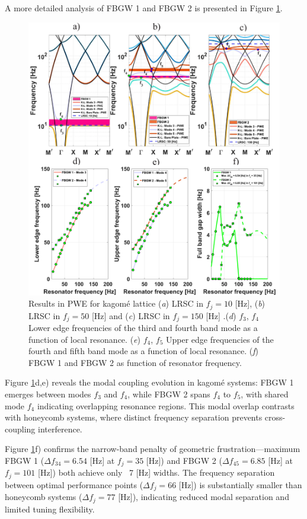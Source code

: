 \documentclass[review,numbers,sort&compress]{elsarticle}
\begin{document}
A more detailed analysis of FBGW 1 and FBGW 2 is presented in Figure \ref{pwe_disp_hex_all_res}.
\newpage
\begin{figure}[htb]
	\centering
	\includegraphics[width=.9\textwidth]{2_5_disp_frf_kag.pdf}
	\caption{Results in PWE for kagomé lattice (\textit{a}) LRSC in $f_j=10$ [Hz], (\textit{b}) LRSC in $f_j=50$ [Hz] and (\textit{c}) LRSC in $f_j=150$ [Hz] .(\textit{d}) $f_3$, $f_4$ Lower edge frequencies of the third and fourth band mode as a function of local resonance. (\textit{e}) $f_4$, $f_5$ Upper edge frequencies of the fourth and fifth band mode as a function of local resonance. (\textit{f}) FBGW 1 and FBGW 2 as function of resonator frequency. }
	\label{pwe_disp_hex_all_res}
\end{figure}

Figure \ref{pwe_disp_hex_all_res}d,e) reveals the modal coupling evolution in kagomé systems: FBGW 1 emerges between modes \( f_3 \) and \( f_4 \), while FBGW 2 spans \( f_4 \) to \( f_5 \), with shared mode \( f_4 \) indicating overlapping resonance regions. This modal overlap contrasts with honeycomb systems, where distinct frequency separation prevents cross-coupling interference.

Figure \ref{pwe_disp_hex_all_res}f) confirms the narrow-band penalty of geometric frustration—maximum FBGW 1 (\( \Delta f_{34} = 6.54 \) [Hz] at \( f_j = 35 \) [Hz]) and FBGW 2 (\( \Delta f_{45} = 6.85 \) [Hz] at \( f_j = 101 \) [Hz]) both achieve only ~7 [Hz] widths. The frequency separation between optimal performance points (\( \Delta f_j = 66 \) [Hz]) is substantially smaller than honeycomb systems (\( \Delta f_j = 77 \) [Hz]), indicating reduced modal separation and limited tuning flexibility. 
\end{document}
